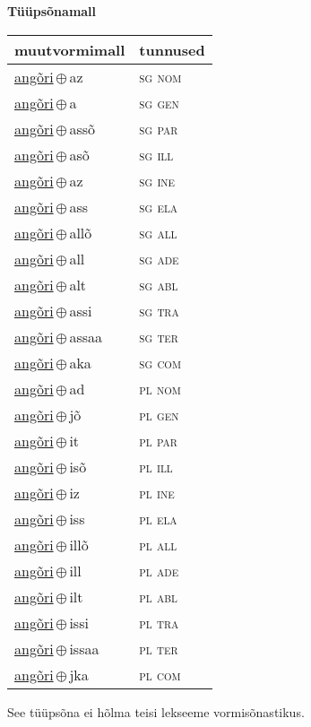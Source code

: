 

\vspace{3.5em}
\noindent \begin{minipage}{\textwidth}
\noindent \textbf{Tüüpsõnamall \,}\\

\begin{sideways}
\begin{tabular}{l l}
muutvormimall & tunnused \\
\hline
\underline{angõri}\,$\oplus$\,az & \textsc{ sg nom } \\
\underline{angõri}\,$\oplus$\,a & \textsc{ sg gen } \\
\underline{angõri}\,$\oplus$\,assõ & \textsc{ sg par } \\
\underline{angõri}\,$\oplus$\,asõ & \textsc{ sg ill } \\
\underline{angõri}\,$\oplus$\,az & \textsc{ sg ine } \\
\underline{angõri}\,$\oplus$\,ass & \textsc{ sg ela } \\
\underline{angõri}\,$\oplus$\,allõ & \textsc{ sg all } \\
\underline{angõri}\,$\oplus$\,all & \textsc{ sg ade } \\
\underline{angõri}\,$\oplus$\,alt & \textsc{ sg abl } \\
\underline{angõri}\,$\oplus$\,assi & \textsc{ sg tra } \\
\underline{angõri}\,$\oplus$\,assaa & \textsc{ sg ter } \\
\underline{angõri}\,$\oplus$\,aka & \textsc{ sg com } \\
\underline{angõri}\,$\oplus$\,ad & \textsc{ pl nom } \\
\underline{angõri}\,$\oplus$\,jõ & \textsc{ pl gen } \\
\underline{angõri}\,$\oplus$\,it & \textsc{ pl par } \\
\underline{angõri}\,$\oplus$\,isõ & \textsc{ pl ill } \\
\underline{angõri}\,$\oplus$\,iz & \textsc{ pl ine } \\
\underline{angõri}\,$\oplus$\,iss & \textsc{ pl ela } \\
\underline{angõri}\,$\oplus$\,illõ & \textsc{ pl all } \\
\underline{angõri}\,$\oplus$\,ill & \textsc{ pl ade } \\
\underline{angõri}\,$\oplus$\,ilt & \textsc{ pl abl } \\
\underline{angõri}\,$\oplus$\,issi & \textsc{ pl tra } \\
\underline{angõri}\,$\oplus$\,issaa & \textsc{ pl ter } \\
\underline{angõri}\,$\oplus$\,jka & \textsc{ pl com } \\
\end{tabular}
\end{sideways}
\label{tab:tüüpsõnamall-angõriaz}

\end{minipage}

 
\vspace{1em}
\noindent See tüüpsõna ei hõlma teisi lekseeme vormi\-sõnastikus.
